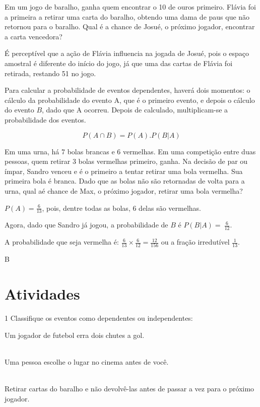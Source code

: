 {Em um jogo de baralho, ganha quem encontrar o 10 de
ouros primeiro. Flávia foi a primeira a retirar uma carta do baralho,
obtendo uma dama de paus que não retornou para o baralho. Qual é a
chance de Josué, o próximo jogador, encontrar a carta vencedora?

É perceptível que a ação de Flávia influencia na jogada de Josué, pois o
espaço amostral é diferente do início do jogo, já que uma das cartas de
Flávia foi retirada, restando 51 no jogo.

Para calcular a probabilidade de eventos dependentes, haverá dois
momentos: o cálculo da probabilidade do evento A, que é o primeiro
evento, e depois o cálculo do evento $B$, dado que A ocorreu. Depois de
calculado, multiplicam-se a probabilidade dos eventos.

$$P(A \cap B)  =  P(A).P(B|A)$$

\medskip{} 

Em uma urna, há 7 bolas brancas e 6 vermelhas. Em uma
competição entre duas pessoas, quem retirar 3 bolas vermelhas primeiro,
ganha. Na decisão de par ou ímpar, Sandro venceu e é o primeiro a tentar
retirar uma bola vermelha. Sua primeira bola é branca. Dado que as bolas
não são retornadas de volta para a urna, qual aé chance de Max, o
próximo jogador, retirar uma bola vermelha?

$P(A) = \frac{6}{13}$, pois, dentre todas as bolas, 6 delas são
vermelhas.

Agora, dado que Sandro já jogou, a probabilidade de $B$ é
$P(B|A) = \ \frac{6}{12}$.

A probabilidade que seja vermelha é:
$\frac{6}{13} \times \frac{6}{12} = \frac{12}{156}$ ou a fração
irredutível $\frac{1}{13}$.
}B

\section*{Atividades}

\num{1} Classifique os eventos como dependentes ou independentes:

\begin{escolha}[itemsep=0pt]

\item Um jogador de futebol erra dois chutes a gol.
 \\ \\

\item Uma pessoa escolhe o lugar no cinema antes de você.
 \\ \\

\item Retirar cartas do baralho e não devolvê-las antes de passar a vez para o próximo jogador.
 \\ \\

\end{escolha}

